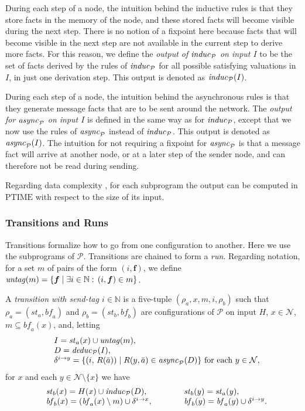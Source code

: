 \documentclass{tlp}
\newcommand{\Nat}{\mathbb{N}}  \newcommand{\len}[1]{|#1|} \newcommand{\rom}[1]{\text{\emph{(#1)}}} \newcommand{\romI}{\rom i}
\newcommand{\ded}{\mathcal{P}}
\newcommand{\timecomplexity}[1]{{\scriptstyle \text{#1}}}
\newcommand{\ptime}{\timecomplexity{PTIME}}
\newcommand{\fc}{\boldsymbol{f}}
\newcommand{\nw}{\mathcal{N}}
\newcommand{\cnf}{\rho}
\newcommand{\cnfs}{\mathit{st}}
\newcommand{\cnfb}{\mathit{bf}}
\newcommand{\pair}[2]{(#1,#2)}
\newcommand{\untag}[1]{\fname{untag}(#1)}
\newcommand{\sendto}[2]{\delta^{#1\to#2}}
\newcommand{\deduc}[1]{\fname{deduc}_{#1}}
\newcommand{\induc}[1]{\fname{induc}_{#1}}
\newcommand{\async}[1]{\fname{async}_{#1}}
\newcommand{\mstep}[1]{(#1)}
\begin{document}
During each step of a node, the intuition behind the inductive rules
is that they store facts in the memory of the node, and these stored
facts will become visible during the next step. There is no notion
of a fixpoint here because facts that will become visible in the next
step are not available in the current step to derive more facts. For
this reason, we define the \emph{output of $\induc{\ded}$ on input
$I$} to be the set of facts derived by the rules of $\induc{\ded}$
for all possible satisfying valuations in $I$, in just one derivation
step. This output is denoted as $\induc{\ded}\mstep I$.

During each step of a node, the intuition behind the asynchronous
rules is that they generate message facts that are to be sent around
the network. The \emph{output for $\async{\ded}$ on input $I$}
is defined in the same way as for $\induc{\ded}$, except that we
now use the rules of $\async{\ded}$ instead of $\induc{\ded}$. This
output is denoted as $\async{\ded}\mstep I$. The intuition for not
requiring a fixpoint for $\async{\ded}$ is that a message fact will
arrive at another node, or at a later step of the sender node, and
can therefore not be read during sending.

Regarding data complexity \cite{vardi_comp}, for each subprogram
the output can be computed in $\ptime$ with respect to the size of
its input.


\subsubsection{Transitions and Runs}

\label{sub:transitions-and-runs}

Transitions formalize how to go from one configuration to another.
Here we use the subprograms of $\ded$. Transitions are chained to
form a \emph{run}. Regarding notation, for a set $m$ of pairs of
the form $\pair i{\fc}$, we define $\untag m=\{\fc\mid\exists i\in\Nat:\,\pair i{\fc}\in m\}$.

A \emph{transition with send-tag $i\in\Nat$} is a five-tuple $(\cnf_{a},x,m,i,\cnf_{b})$
such that $\cnf_{a}=(\cnfs_{a},\cnfb_{a})$ and $\cnf_{b}=(\cnfs_{b},\cnfb_{b})$
are configurations of $\ded$ on input $H$, $x\in\nw$, $m\subseteq\cnfb_{a}(x)$,
and, letting
\[
 \begin{array}{ll}
 & I=\cnfs_{a}(x)\cup\untag m,\\
 & D=\deduc{\ded}(I),\\
 & \sendto iy=\{\pair i{\, R(\bar{a})}\mid R(y,\bar{a})\in\async{\ded}(D)\}\text{ for each }y\in\nw,
 \end{array}
\]
for $x$ and each $y\in\nw\setminus\{x\}$ we have 
\[
 \begin{array}{ll}
    & \cnfs_{b}(x)=H(x)\cup\induc{\ded}(D),\\
    & \cnfb_{b}(x)=(\cnfb_{a}(x)\setminus m)\cup\sendto ix,
 \end{array}
 \qquad
 \begin{array}{ll}
    & \cnfs_{b}(y)=\cnfs_{a}(y),\\
    & \cnfb_{b}(y)=\cnfb_{a}(y)\cup\sendto iy.
 \end{array}
\]
\end{document}
